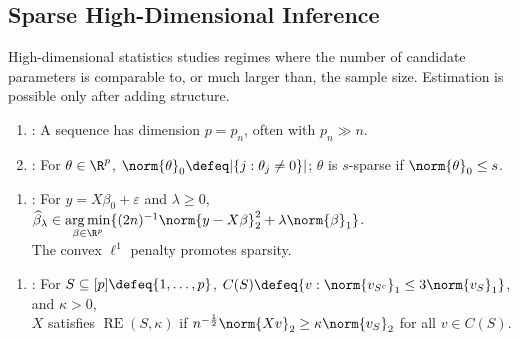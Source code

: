 \subsection{Sparse High-Dimensional Inference}

High-dimensional statistics studies regimes where the number of candidate parameters is comparable to, or much larger than, the sample size.  Estimation is possible only after adding structure.

\begin{definition} \label{def:sparse-vector-and-high-dimensional-regime} 
\begin{enumerate}[label=(\roman*)]
\setlength{\itemsep}{0pt}
\item {}: A sequence has dimension $p=p_n$, often with $p_n\gg n$.
\item {}: For $\theta\in\R^p$, $\norm{\theta}_0\defeq|\{j:\theta_j\neq0\}|$; $\theta$ is $s$-sparse if $\norm{\theta}_0\leq s$.
\end{enumerate}
\end{definition}

\begin{definition} \label{def:lasso-estimator} 
\begin{enumerate}[label=(\roman*)]
\setlength{\itemsep}{0pt}
\item {}: For $y=X\beta_0+\varepsilon$ and $\lambda\geq0$, $\widehat{\beta}_\lambda\in\operatorname*{arg\,min}\limits_{\beta\in\R^p}\{(2n)^{-1}\norm{y-X\beta}_2^2+\lambda\norm{\beta}_1\}$.\\
The convex $\ell^1$ penalty promotes sparsity.
\end{enumerate}
\end{definition}

\begin{definition} \label{def:restricted-eigenvalue-condition} 
\begin{enumerate}[label=(\roman*)]
\setlength{\itemsep}{0pt}
\item {}: For $S\subseteq[p]\defeq\{1,\ldots,p\}$, $C(S)\defeq\{v:\norm{v_{S^c}}_1\leq3\norm{v_S}_1\}$, and $\kappa>0$,\\
$X$ satisfies $\operatorname{RE}(S,\kappa)$ if $n^{-\frac{1}{2}}\norm{Xv}_2\geq\kappa\norm{v_S}_2$ for all $v\in C(S)$.
\end{enumerate}
\end{definition}

